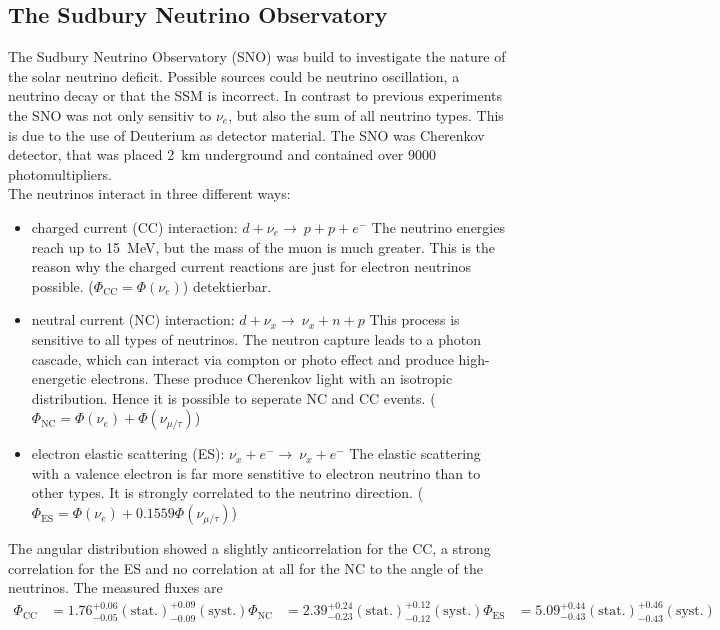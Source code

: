 \subsection{The Sudbury Neutrino Observatory}
The Sudbury Neutrino Observatory (SNO) was build to investigate the nature of the solar neutrino deficit. Possible sources could be neutrino oscillation, a neutrino decay or that the SSM is incorrect. In contrast to previous experiments the SNO was not only sensitiv to $\nu_e$, but also the sum of all neutrino types. This is due to the use of Deuterium as detector material. The SNO was Cherenkov detector, that was placed \SI{2}{\kilo\meter} underground and contained over 9000 photomultipliers.\\
The neutrinos interact in three different ways:
\begin{itemize}
	\item charged current (CC) interaction: $d + \nu_e \rightarrow \ p + p + e^-$
  The neutrino energies reach up to \SI{15}{\MeV}, but the mass of the muon is much greater. This is the reason why the charged current reactions are just for electron neutrinos possible. ($\Phi_{\text{CC}} = \Phi(\nu_e)$)
  detektierbar.
  \item neutral current (NC) interaction: $d + \nu_x \rightarrow \ \nu_x + n + p$
  This process is sensitive to all types of neutrinos. The neutron capture leads to a photon cascade, which can interact via compton or photo effect and produce high-energetic electrons. These produce Cherenkov light with an isotropic distribution. Hence it is possible to seperate NC and CC events. ($\Phi_{\text{NC}} = \Phi(\nu_e) + \Phi(\nu_{\mu/\tau})$)

  \item electron elastic scattering (ES): $\nu_x + e^- \rightarrow \ \nu_x + e^-$
  The elastic scattering with a valence electron is far more senstitive to electron neutrino than to other types. It is strongly correlated to the neutrino direction. ($\Phi_{\text{ES}}= \Phi(\nu_e) + 0.1559\Phi(\nu_{\mu/\tau})$)
\end{itemize}
The angular distribution showed a slightly anticorrelation for the CC, a strong correlation for the ES and no correlation at all for the NC to the angle of the neutrinos. The measured fluxes are
\begin{align*}
	\Phi_{\text{CC}} &= 1.76^{+0.06}_{-0.05}(\text{stat.})^{+0.09}_{-0.09}(\text{syst.})
	\Phi_{\text{NC}} &= 2.39^{+0.24}_{-0.23}(\text{stat.})^{+0.12}_{-0.12}(\text{syst.})
	\Phi_{\text{ES}} &= 5.09^{+0.44}_{-0.43}(\text{stat.})^{+0.46}_{-0.43}(\text{syst.})
\end{align*}
